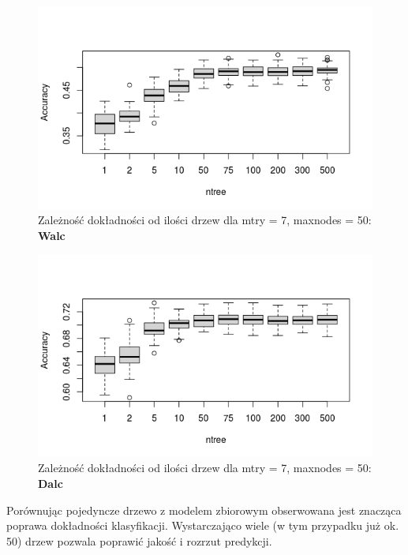\FloatBarrier
\begin{figure}[h]
     \centering 
     \includegraphics[scale=0.80]{tex/W_ntree.png}
      \caption{Zależność dokładności od ilości drzew dla mtry = 7, maxnodes = 50: \textbf{Walc}}
       \label{fig:W_ntree}
\end{figure}
\begin{figure}[h]
     \centering 
     \includegraphics[scale=0.80]{tex/D_ntree.png}
     \caption{Zależność dokładności od ilości drzew dla mtry = 7, maxnodes = 50: \textbf{Dalc}}
     \label{fig:D_ntree}
\end{figure}
\FloatBarrier
Porównując pojedyncze drzewo z modelem zbiorowym obserwowana jest znacząca poprawa dokładności klasyfikacji. Wystarczająco wiele (w tym przypadku już ok. 50) drzew pozwala poprawić jakość i rozrzut predykcji.